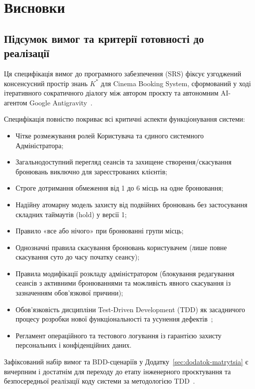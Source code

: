 \section{Висновки}\label{sec:vysnovky}

\subsection{Підсумок вимог та критерії готовності до реалізації}\label{sec:vysnovky-pidsumok}
Ця специфікація вимог до програмного забезпечення (SRS) фіксує узгоджений консенсусний простір знань $K^*$ для Cinema Booking System, сформований у ході ітеративного сократичного діалогу між автором проєкту та автономним AI-агентом Google Antigravity~.

Специфікація повністю покриває всі критичні аспекти функціонування системи:
\begin{itemize}
    \item Чітке розмежування ролей Користувача та єдиного системного Адміністратора;
    \item Загальнодоступний перегляд сеансів та захищене створення/скасування бронювань виключно для зареєстрованих клієнтів;
    \item Строге дотримання обмеження від 1 до 6 місць на одне бронювання;
    \item Надійну атомарну модель захисту від подвійних бронювань без застосування складних таймаутів (hold) у версії 1;
    \item Правило «все або нічого» при бронюванні групи місць;
    \item Однозначні правила скасування бронювань користувачем (лише повне скасування суто до часу початку сеансу);
    \item Правила модифікації розкладу адміністратором (блокування редагування сеансів з активними бронюваннями та можливість явного скасування із зазначенням обов'язкової причини);
    \item Обов'язковість дисципліни Test-Driven Development (TDD) як засадничого процесу розробки нової функціональності та усунення дефектів~;
    \item Регламент операційного та тестового логування із гарантією захисту персональних і конфіденційних даних.
\end{itemize}

Зафіксований набір вимог та BDD-сценаріїв у Додатку~\ref{sec:dodatok-matrytsia} є вичерпним і достатнім для переходу до етапу інженерного проєктування та безпосередньої реалізації коду системи за методологією TDD~.
